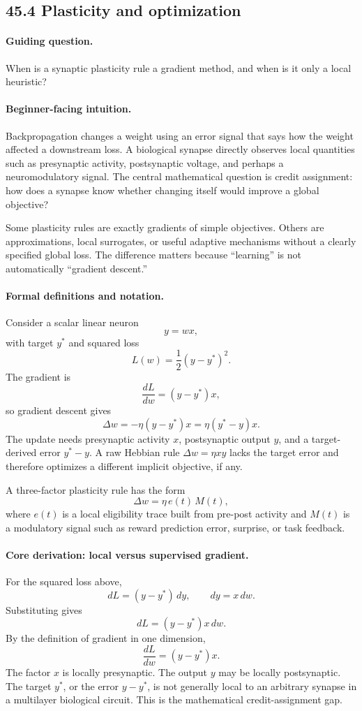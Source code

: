 \subsection{45.4 Plasticity and optimization}

\paragraph{Guiding question.}
When is a synaptic plasticity rule a gradient method, and when is it only a local heuristic?

\paragraph{Beginner-facing intuition.}
Backpropagation changes a weight using an error signal that says how the weight affected a downstream loss. A biological synapse directly observes local quantities such as presynaptic activity, postsynaptic voltage, and perhaps a neuromodulatory signal. The central mathematical question is credit assignment: how does a synapse know whether changing itself would improve a global objective?

Some plasticity rules are exactly gradients of simple objectives. Others are approximations, local surrogates, or useful adaptive mechanisms without a clearly specified global loss. The difference matters because ``learning'' is not automatically ``gradient descent.''

\paragraph{Formal definitions and notation.}
Consider a scalar linear neuron
\[
y=wx,
\]
with target \(y^*\) and squared loss
\[
L(w)=\frac12(y-y^*)^2.
\]
The gradient is
\[
\frac{dL}{dw}=(y-y^*)x,
\]
so gradient descent gives
\[
\Delta w=-\eta (y-y^*)x=\eta(y^*-y)x.
\]
The update needs presynaptic activity \(x\), postsynaptic output \(y\), and a target-derived error \(y^*-y\). A raw Hebbian rule \(\Delta w=\eta xy\) lacks the target error and therefore optimizes a different implicit objective, if any.

A three-factor plasticity rule has the form
\[
\Delta w=\eta\, e(t)\,M(t),
\]
where \(e(t)\) is a local eligibility trace built from pre-post activity and \(M(t)\) is a modulatory signal such as reward prediction error, surprise, or task feedback.

\paragraph{Core derivation: local versus supervised gradient.}
For the squared loss above,
\[
dL=(y-y^*)\,dy,
\qquad
dy=x\,dw.
\]
Substituting gives
\[
dL=(y-y^*)x\,dw.
\]
By the definition of gradient in one dimension,
\[
\frac{dL}{dw}=(y-y^*)x.
\]
The factor \(x\) is locally presynaptic. The output \(y\) may be locally postsynaptic. The target \(y^*\), or the error \(y-y^*\), is not generally local to an arbitrary synapse in a multilayer biological circuit. This is the mathematical credit-assignment gap.

